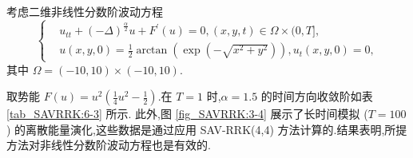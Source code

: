 	\begin{example}\label{exp_SAVRRK:3}
		\cite{wangUnconditionalEnergyDissipation2021} 
		考虑二维非线性分数阶波动方程
		\begin{equation}
		\begin{cases}
		& u_{t t}+(-\Delta)^{\frac{\alpha}{2}} u+F^{\prime}(u)=0,(x, y, t) \in \Omega \times(0, T],\\
		& u(x, y, 0)=\frac{1}{2} \arctan \left(\exp \left(-\sqrt{x^2+y^2}\right)\right), u_t(x, y, 0)=0,
		\end{cases}
		\end{equation}
		其中 $\Omega=(-10,10) \times(-10,10)$.
		\end{example}
		
		取势能 $F(u)=u^2\left(\frac{1}{4} u^2-\frac{1}{2}\right)$.在 $T=1$ 时,$\alpha=1.5$ 的时间方向收敛阶如表 \ref{tab_SAVRRK:6-3} 所示.
		此外,图 \ref{fig_SAVRRK:3-4} 展示了长时间模拟 ($T=100$) 的离散能量演化,这些数据是通过应用 SAV-RRK(4,4) 方法计算的.结果表明,所提方法对非线性分数阶波动方程也是有效的.
		
